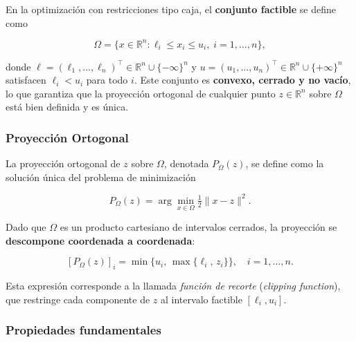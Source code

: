 \documentclass[
  spanish,
  us-letterpaper,
  DIV=11,
  numbers=noendperiod]{scrreprt}
\numberwithin{equation}{section}
\begin{document}
En la optimización con restricciones tipo caja, el \textbf{conjunto
factible} se define como

\[
\Omega = \{x \in \mathbb{R}^n : \ell_i \le x_i \le u_i,\; i = 1,\dots,n\},
\]

donde
\(\ell = (\ell_1,\dots,\ell_n)^\top \in \mathbb{R}^n \cup \{-\infty\}^n\)
y \(u = (u_1,\dots,u_n)^\top \in \mathbb{R}^n \cup \{+\infty\}^n\)
satisfacen \(\ell_i < u_i\) para todo \(i\). Este conjunto es
\textbf{convexo, cerrado y no vacío}, lo que garantiza que la proyección
ortogonal de cualquier punto \(z \in \mathbb{R}^n\) sobre \(\Omega\)
está bien definida y es única.

\subsubsection{Proyección Ortogonal}\label{proyecciuxf3n-ortogonal}

La proyección ortogonal de \(z\) sobre \(\Omega\), denotada
\(P_\Omega(z)\), se define como la solución única del problema de
minimización

\[
P_\Omega(z) = \arg\min_{x \in \Omega} \tfrac{1}{2}\|x - z\|^2. \tag{3.18}
\]

Dado que \(\Omega\) es un producto cartesiano de intervalos cerrados, la
proyección se \textbf{descompone coordenada a coordenada}:

\[
[P_\Omega(z)]_i = \min\{u_i,\, \max\{\ell_i,\, z_i\}\}, \quad i = 1,\dots,n. \tag{3.19}
\]

Esta expresión corresponde a la llamada \emph{función de recorte}
(\emph{clipping function}), que restringe cada componente de \(z\) al
intervalo factible \([\ell_i,u_i]\).

\subsubsection{Propiedades
fundamentales}\label{propiedades-fundamentales}
\end{document}
